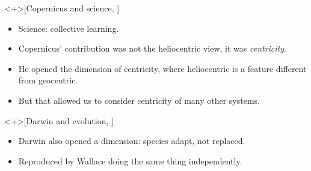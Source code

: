 \begin{frame}
  \begin{example}<+>[Copernicus and science, 
    {\cite[pp.~155--156]{NecessaryConditionsOfLearning}}]
    \begin{itemize}
      \item Science: collective learning.
      \item Copernicus' contribution was not the heliocentric view, it was 
        \emph{centricity}.
      \item He opened the dimension of centricity, where heliocentric is a 
        feature different from geocentric.
      \item But that allowed us to consider centricity of many other systems.
    \end{itemize}
  \end{example}

  \begin{example}<+>[Darwin and evolution, 
    {\cite[pp.~157--160]{NecessaryConditionsOfLearning}}]
    \begin{itemize}
      \item Darwin also opened a dimension: species adapt, not replaced.
      \item Reproduced by Wallace doing the same thing independently.
    \end{itemize}
  \end{example}
\end{frame}

\begin{frame}
\end{frame}


